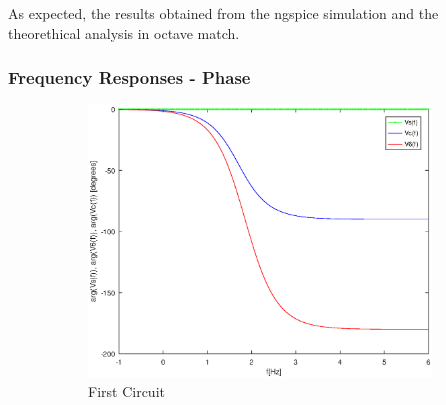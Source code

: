 As expected, the results obtained from the ngspice simulation and the theorethical analysis in octave match.

\subsubsection{Frequency Responses - Phase}

\begin{figure}[H] 
\centering
\begin{subfigure}{0.5\textwidth}
\includegraphics[width=\textwidth]{Arguments.eps}
\caption{First Circuit}
\label{fig:first}
\end{subfigure}
\begin{subfigure}{0.42\textwidth}

\end{subfigure}
\end{figure}
